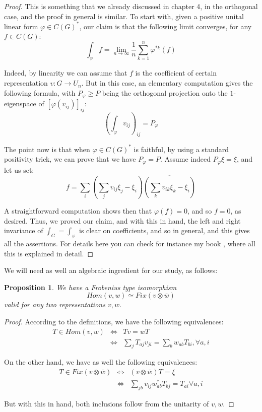 \documentclass[12pt]{amsbook}
\newtheorem{proposition}[theorem]{Proposition}
\begin{document}
\begin{proof}
This is something that we already discussed in chapter 4, in the orthogonal case, and the proof in general is similar. To start with, given a positive unital linear form $\varphi\in C(G)^*$, our claim is that the following limit converges, for any $f\in C(G)$:
$$\int_\varphi f=\lim_{n\to\infty}\frac{1}{n}\sum_{k=1}^n\varphi^{*k}(f)$$

Indeed, by linearity we can assume that $f$ is the coefficient of certain representation $v:G\to U_n$. But in this case, an elementary computation gives the following formula, with $P_\varphi\geq P$ being the orthogonal projection onto the $1$-eigenspace of $[\varphi(v_{ij})]_{ij}$:
$$\left(\int_\varphi v_{ij}\right)_{ij}=P_\varphi$$

The point now is that when $\varphi\in C(G)^*$ is faithful, by using a standard positivity trick, we can prove that we have $P_\varphi=P$. Assume indeed $P_\varphi\xi=\xi$, and let us set:
$$f=\sum_i\left(\sum_jv_{ij}\xi_j-\xi_i\right)\overline{\left(\sum_kv_{ik}\xi_k-\xi_i\right)}$$

A straightforward computation shows then that $\varphi(f)=0$, and so $f=0$, as desired. Thus, we proved our claim, and with this in hand, the left and right invariance of $\int_G=\int_\varphi$ is clear on coefficients, and so in general, and this gives all the assertions. For details here you can check for instance my book \cite{ba1}, where all this is explained in detail.
\end{proof}

We will need as well an algebraic ingredient for our study, as follows:


\begin{proposition}
We have a Frobenius type isomorphism
$$Hom(v,w)\simeq Fix(v\otimes\bar{w})$$
valid for any two representations $v,w$.
\end{proposition}

\begin{proof}
According to the definitions, we have the following equivalences:
\begin{eqnarray*}
T\in Hom(v,w)
&\iff&Tv=wT\\
&\iff&\sum_jT_{aj}v_{ji}=\sum_bw_{ab}T_{bi},\forall a,i
\end{eqnarray*}

On the other hand, we have as well the following equivalences:
\begin{eqnarray*}
T\in Fix(v\otimes\bar{w})
&\iff&(v\otimes\bar{w})T=\xi\\
&\iff&\sum_{jb}v_{ij}w_{ab}^*T_{bj}=T_{ai}\forall a,i
\end{eqnarray*}

But with this in hand, both inclusions follow from the unitarity of $v,w$.
\end{proof}
\end{document}
